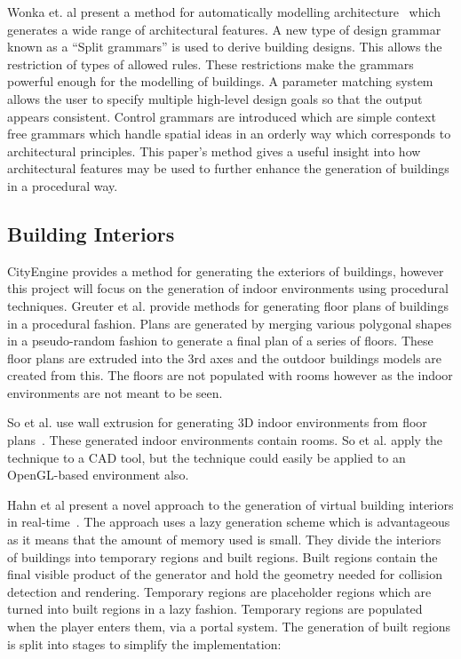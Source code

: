 \documentclass[12pt]{article}
\begin{document}
Wonka et. al present a method for automatically modelling architecture~\cite{wonka2003instant} which generates a wide range of architectural features.
A new type of design grammar known as a ``Split grammars'' is used to derive building designs.
This allows the restriction of types of allowed rules. 
These restrictions make the grammars powerful enough for the modelling of buildings.
A parameter matching system allows the user to specify multiple high-level design goals so that the output appears consistent.
Control grammars are introduced which are simple context free grammars which handle spatial ideas in an orderly way which corresponds to architectural principles.
This paper's method gives a useful insight into how architectural features may be used to further enhance the generation of buildings in a procedural way.


\subsection{Building Interiors}
CityEngine provides a method for generating the exteriors of buildings, however this project will focus on the generation of indoor environments using procedural techniques.
Greuter et al. provide methods for generating\cite{greuter2003real} floor plans of buildings in a procedural fashion.
Plans are generated by merging various polygonal shapes in a pseudo-random fashion to generate a final plan of a series of floors.
These floor plans are extruded into the 3rd axes and the outdoor buildings models are created from this.
The floors are not populated with rooms however as the indoor environments are not meant to be seen.

So et al. use wall extrusion for generating 3D indoor environments from floor plans~\cite{so1998reconstruction}.
These generated indoor environments contain rooms.
So et al. apply the technique to a CAD tool, but the technique could easily be applied to an OpenGL-based environment also.

Hahn et al present a novel approach to the generation of virtual building interiors in real-time~\cite{hahn2006persistent}.
The approach uses a lazy generation scheme which is advantageous as it means that the amount of memory used is small. 
They divide the interiors of buildings into temporary regions and built regions.
Built regions contain the final visible product of the generator and hold the geometry needed for collision detection and rendering.
Temporary regions are placeholder regions which are turned into built regions in a lazy fashion.
Temporary regions are populated when the player enters them, via a portal system.
The generation of built regions is split into stages to simplify the implementation:
\end{document}
